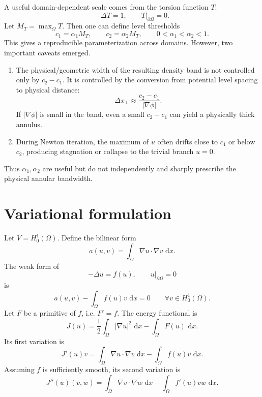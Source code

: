 \documentclass[11pt,a4paper]{article}
\newcommand{\Om}{\Omega}
\newcommand{\dd}{\,\mathrm{d}}
\begin{document}
A useful domain-dependent scale comes from the torsion function $T$:
\begin{equation}
  -\Delta T=1,
  \qquad T|_{\partial\Om}=0.
\end{equation}
Let $M_T=\max_\Om T$. Then one can define level thresholds
\begin{equation}
  c_1=\alpha_1 M_T,
  \qquad
  c_2=\alpha_2 M_T,
  \qquad 0<\alpha_1<\alpha_2<1.
\end{equation}
This gives a reproducible parameterization across domains. However, two important caveats emerged.

\begin{enumerate}[leftmargin=2em]
  \item The physical/geometric width of the resulting density band is not controlled only by $c_2-c_1$. It is controlled by the conversion from potential level spacing to physical distance:
  \begin{equation}
    \Delta x_\perp \approx \frac{c_2-c_1}{|\nabla\phi|}.
  \end{equation}
  If $|\nabla\phi|$ is small in the band, even a small $c_2-c_1$ can yield a physically thick annulus.
  \item During Newton iteration, the maximum of $u$ often drifts close to $c_1$ or below $c_2$, producing stagnation or collapse to the trivial branch $u=0$.
\end{enumerate}

Thus $\alpha_1,\alpha_2$ are useful but do not independently and sharply prescribe the physical annular bandwidth.

\section{Variational formulation}

Let $V=H_0^1(\Om)$. Define the bilinear form
\begin{equation}
  a(u,v)=\int_\Om \nabla u\cdot\nabla v\,\dd x.
\end{equation}
The weak form of
\begin{equation}
  -\Delta u=f(u),\qquad u|_{\partial\Om}=0
\end{equation}
is
\begin{equation}
  a(u,v)-\int_\Om f(u)v\,\dd x=0\qquad\forall v\in H_0^1(\Om).
\end{equation}
Let $F$ be a primitive of $f$, i.e. $F'=f$. The energy functional is
\begin{equation}
  J(u)=\frac12\int_\Om |\nabla u|^2\,\dd x-\int_\Om F(u)\,\dd x.
\end{equation}
Its first variation is
\begin{equation}
  J'(u)v=\int_\Om\nabla u\cdot\nabla v\,\dd x-
  \int_\Om f(u)v\,\dd x.
\end{equation}
Assuming $f$ is sufficiently smooth, its second variation is
\begin{equation}
  J''(u)(v,w)=\int_\Om \nabla v\cdot\nabla w\,\dd x-
  \int_\Om f'(u)vw\,\dd x.
\end{equation}
\end{document}
